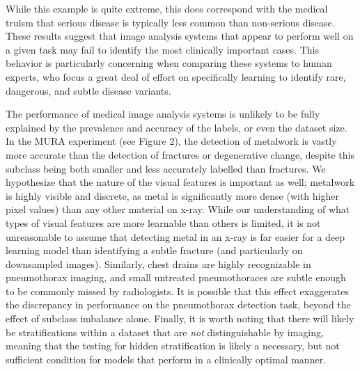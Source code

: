 \documentclass[sigconf,anonymous,review]{acmart}
\begin{document}
While this example is quite extreme, this does correspond with the medical truism that serious disease is typically less common than non-serious disease. 
These results suggest that image analysis systems that appear to perform well on a given task may fail to identify the most clinically important cases. 
This behavior is particularly concerning when comparing these systems to human experts, who focus a great deal of effort on specifically learning to identify rare, dangerous, and subtle disease variants.

The performance of medical image analysis systems is unlikely to be fully explained by the prevalence and accuracy of the labels, or even the dataset size. 
In the MURA experiment (see Figure 2), the detection of metalwork is vastly more accurate than the detection of fractures or degenerative change, despite this subclass being both smaller and less accurately labelled than fractures. 
We hypothesize that the nature of the visual features is important as well; metalwork is highly visible and discrete, as metal is significantly more dense (with higher pixel values) than any other material on x-ray. 
While our understanding of what types of visual features are more learnable than others is limited, it is not unreasonable to assume that detecting metal in an x-ray is far easier for a deep learning model than identifying a subtle fracture (and particularly on downsampled images).
Similarly, chest drains are highly recognizable in pneumothorax imaging, and small untreated pneumothoraces are subtle enough to be commonly missed by radiologists. 
It is possible that this effect exaggerates the discrepancy in performance on the pneumothorax detection task, beyond the effect of subclass imbalance alone.
Finally, it is worth noting that there will likely be stratifications within a dataset that are \textit{not} distinguishable by imaging, meaning that the testing for hidden stratification is likely a necessary, but not sufficient condition for models that perform in a clinically optimal manner.
\end{document}
